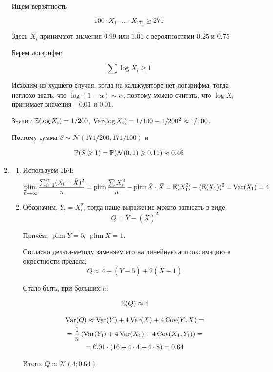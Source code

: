 \documentclass[12pt, a4paper]{article}\usepackage[]{graphicx}\usepackage[]{color}
\DeclareMathOperator*\plim{plim}
\newcommand{\cN}{\mathcal{N}}
\begin{document}
\begin{enumerate}
Ищем вероятность

\[
100\cdot X_1 \cdot \ldots \cdot X_{171} \geq 271
\]

Здесь $X_i$ принимают значения $0.99$ или $1.01$ с вероятностями $0.25$ и $0.75$

Берем логарифм:

\[
\sum \log X_i \geq 1
\]

Исходим из худшего случая, когда на калькуляторе нет логарифма, тогда неплохо знать, что $\log (1+\alpha) \sim \alpha$, поэтому можно считать, что $\log X_i$ принимает значения $-0.01$ и $0.01$.

Значит $\mathbb{E}(\log X_i)=1/200$, $\operatorname{Var}(\log X_i)=1/100 - 1/200^2 \approx 1/100$.

Поэтому сумма $S \sim \cN(171/200, 171/100)$ и

\[
\P(S \geq 1)=\P(\cN(0, 1) \geq 0.11) \approx 0.46
\]

\item
\begin{enumerate}
\item Используем ЗБЧ:
\[
\plim_{n \to \infty} \frac{\sum_{i=1}^n (X_i - \bar{X})^2}{n} = \plim \frac{\sum X_i^2}{n} - \plim \bar X \cdot \bar X = \E(X_1^2) - (\E(X_1))^2 = \Var(X_1) = 4
\]
\item Обозначим, $Y_i=X_i^2$, тогда наше выражение можно записать в виде:
\[
Q=\overline{Y} - (\overline{X})^2
\]

Причём, $\plim \bar Y = 5$, $\plim \bar X = 1$.

Согласно дельта-методу заменяем его на линейную аппроксимацию в окрестности предела:
\[
Q\approx 4 + (\bar Y - 5) + 2 (\bar X - 1)
\]

Стало быть, при больших $n$:

\[
\mathbb{E}(Q) \approx 4
\]

\begin{multline*}
\operatorname{Var}(Q) \approx \operatorname{Var}(\bar Y) + 4\operatorname{Var}(\bar X) + 4\operatorname{Cov}(\bar Y, \bar X) =\\
= \frac{1}{n} \left(\operatorname{Var}(Y_1) + 4 \operatorname{Var}(X_1) + 4\operatorname{Cov}(X_1, Y_1) \right) = \\
= 0.01 \cdot (16 + 4 \cdot 4 + 4 \cdot 8)= 0.64
\end{multline*}

Итого, $Q \approx \cN(4; 0.64)$

\end{enumerate}

\end{enumerate}
\end{document}
